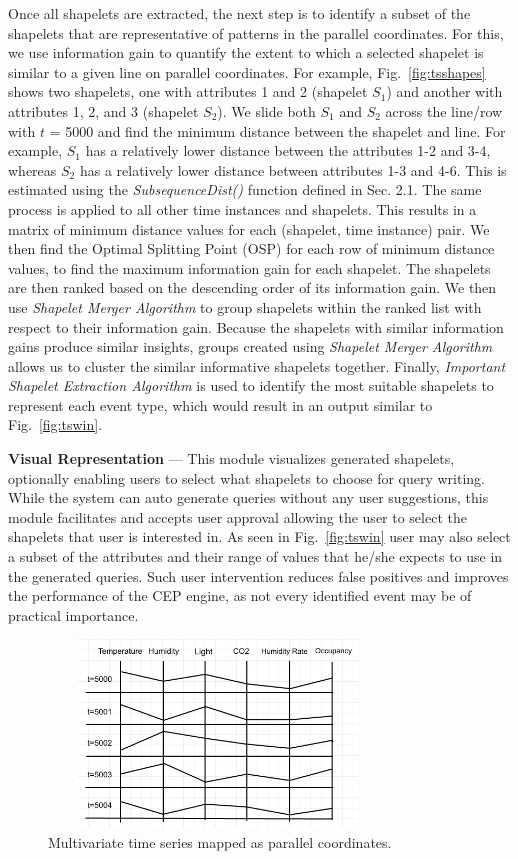 \documentclass[conference]{IEEEtran}  %
\begin{document}
Once all shapelets are extracted, the next step is to identify a subset of the shapelets that are representative of patterns in the parallel coordinates. For this, we use information gain to quantify the extent to which a selected shapelet is similar to a given line on parallel coordinates. For example, Fig.~\ref{fig:tsshapes} shows two shapelets, one with attributes 1 and 2 (shapelet $S_1$) and another with attributes 1, 2, and 3 (shapelet $S_2$). We slide both $S_1$ and $S_2$ across the line/row with $t$ = 5000 and find the minimum distance between the shapelet and line. For example, $S_1$ has a relatively lower distance between the attributes 1-2 and 3-4, whereas $S_2$ has a relatively lower distance between attributes 1-3 and 4-6. This is estimated using the \textit{SubsequenceDist()} function defined in Sec. 2.1. The same process is applied to all other time instances and shapelets. This results in a matrix of minimum distance values for each (shapelet, time instance) pair. We then find the Optimal Splitting Point (OSP) \cite{IEEEexample:TimeSeriesShapelets} for each row of minimum distance values, to find the maximum information gain for each shapelet. The shapelets are then ranked based on the descending order of its information gain. We then use \textit{Shapelet Merger Algorithm} to group shapelets within the ranked list with respect to their information gain. Because the shapelets with similar information gains produce similar insights, groups created using \textit{Shapelet Merger Algorithm} allows us to cluster the similar informative shapelets together. Finally, \textit{Important Shapelet Extraction Algorithm} is used to identify the most suitable shapelets to represent each event type, which would result in an output similar to Fig.~\ref{fig:tswin}.

\textbf{Visual Representation} --- This module visualizes generated shapelets, optionally enabling users to select what shapelets to choose for query writing. While the system can auto generate queries without any user suggestions, this module facilitates and accepts user approval allowing the user to select the shapelets that user is interested in. As seen in Fig.~\ref{fig:tswin} user may also select a subset of the attributes and their range of values that he/she expects to use in the generated queries. Such user intervention reduces false positives and improves the performance of the CEP engine, as not every identified event may be of practical importance.

\begin{figure}
\includegraphics[width=9cm,height=5cm]{multivariateTime.png}
\caption{Multivariate time series mapped as parallel coordinates.}
\label{fig:tsdata}
\end{figure}
\end{document}
